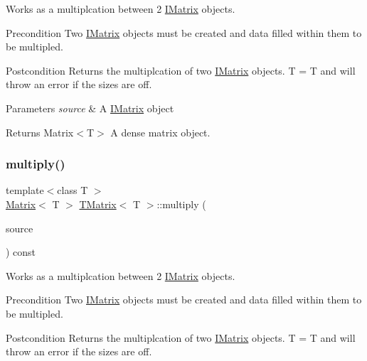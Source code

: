 Works as a multiplcation between 2 \mbox{\hyperlink{class_i_matrix}{I\+Matrix}} objects. 

\begin{DoxyPrecond}{Precondition}
Two \mbox{\hyperlink{class_i_matrix}{I\+Matrix}} objects must be created and data filled within them to be multipled. 
\end{DoxyPrecond}
\begin{DoxyPostcond}{Postcondition}
Returns the multiplcation of two \mbox{\hyperlink{class_i_matrix}{I\+Matrix}} objects. T = T and will throw an error if the sizes are off.
\end{DoxyPostcond}

\begin{DoxyParams}{Parameters}
{\em source} & A \mbox{\hyperlink{class_i_matrix}{I\+Matrix}} object \\
\hline
\end{DoxyParams}
\begin{DoxyReturn}{Returns}
Matrix$<$\+T$>$ A dense matrix object. 
\end{DoxyReturn}
\mbox{\label{class_t_matrix_a2d660bacd273f355571b06188f4a87d6}} 
\subsubsection{\texorpdfstring{multiply()}{multiply()}\hspace{0.1cm}{\footnotesize\ttfamily [5/6]}}
{\footnotesize\ttfamily template$<$class T $>$ \\
\mbox{\hyperlink{class_matrix}{Matrix}}$<$ T $>$ \mbox{\hyperlink{class_t_matrix}{T\+Matrix}}$<$ T $>$\+::multiply (\begin{DoxyParamCaption}\item[{const \mbox{\hyperlink{class_i_matrix}{I\+Matrix}}$<$ \mbox{\hyperlink{class_s_matrix}{S\+Matrix}}$<$ T $>$, T $>$ \&}]{source }\end{DoxyParamCaption}) const}



Works as a multiplcation between 2 \mbox{\hyperlink{class_i_matrix}{I\+Matrix}} objects. 

\begin{DoxyPrecond}{Precondition}
Two \mbox{\hyperlink{class_i_matrix}{I\+Matrix}} objects must be created and data filled within them to be multipled. 
\end{DoxyPrecond}
\begin{DoxyPostcond}{Postcondition}
Returns the multiplcation of two \mbox{\hyperlink{class_i_matrix}{I\+Matrix}} objects. T = T and will throw an error if the sizes are off.
\end{DoxyPostcond}

